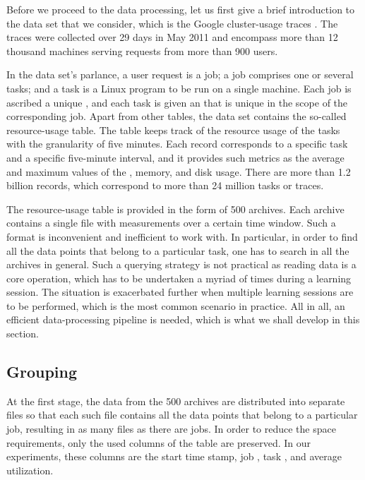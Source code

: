Before we proceed to the data processing, let us first give a brief introduction
to the data set that we consider, which is the Google cluster-usage traces
\cite{reiss2011}. The traces were collected over 29 days in May 2011 and
encompass more than 12 thousand machines serving requests from more than 900
users.

In the data set's parlance, a user request is a job; a job comprises one or
several tasks; and a task is a Linux program to be run on a single machine.
Each job is ascribed a unique , and each task is given an  that is
unique in the scope of the corresponding job. Apart from other tables, the data
set contains the so-called resource-usage table. The table keeps track of the
resource usage of the tasks with the granularity of five minutes. Each record
corresponds to a specific task and a specific five-minute interval, and it
provides such metrics as the average and maximum values of the , memory,
and disk usage. There are more than 1.2 billion records, which correspond to
more than 24 million tasks or traces.

The resource-usage table is provided in the form of 500 archives. Each archive
contains a single  file with measurements over a certain time window.
Such a format is inconvenient and inefficient to work with. In particular, in
order to find all the data points that belong to a particular task, one has to
search in all the archives in general. Such a querying strategy is not practical
as reading data is a core operation, which has to be undertaken a myriad of
times during a learning session. The situation is exacerbated further when
multiple learning sessions are to be performed, which is the most common
scenario in practice. All in all, an efficient data-processing pipeline is
needed, which is what we shall develop in this section.

\subsection{Grouping} 
At the first stage, the  data from the 500 archives are distributed into
separate  files so that each such file contains all the data points that
belong to a particular job, resulting in as many  files as there are
jobs. In order to reduce the space requirements, only the used columns of the
table are preserved. In our experiments, these columns are the start time stamp,
job , task , and average  utilization.

